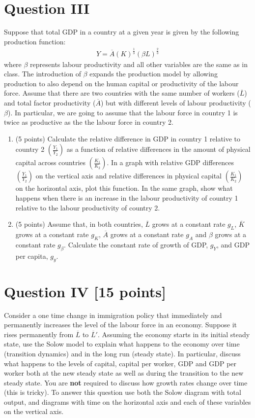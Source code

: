 \documentclass[letterpaper,12pt]{article}
\theoremstyle{dotlessS}
\begin{document}
\section*{Question III}
Suppose that total GDP in a country at a given year is given by the following production function:
\begin{eqnarray*}
Y=\overline{A}(K)^{\frac{1}{3}}(\beta L)^{\frac{2}{3}} 
\end{eqnarray*}
where $\beta$ represents labour productivity and all other variables are the same as in class. The introduction of $\beta$ expands the production model by allowing production to also depend on the human capital or productivity of the labour force.  Assume that there are two countries with the same number of workers ($\overline{L}$) and total factor productivity ($\overline{A}$) but with different levels of labour productivity ($\beta$). In particular, we are going to assume that the labour force in country 1 is twice as productive as the the labour force in country 2.
\begin{enumerate}[label=\alph*]
\item (5 points) Calculate the relative difference in GDP in country 1 relative to country 2 $\left(\frac{Y_1}{Y_2}\right)$ as a function of relative differences in the amount of physical capital  across countries $\left(\frac{K_1}{K_2}\right)$. In a graph with relative GDP differences $\left(\frac{Y_1}{Y_2}\right)$ on the vertical axis and relative differences in physical capital $\left(\frac{K_1}{K_2}\right)$ on the horizontal axis, plot this function. In the same graph, show what happens when there is an increase in the labour productivity of country 1 relative to the labour productivity of country 2.
\item (5 points) Assume that, in both countries, $\overline{L}$ grows at a constant rate $g_L$, $\overline{K}$ grows at a constant rate $g_K$, $\overline{A}$ grows at a constant rate $g_A$ and $\beta$ grows at a constant rate $g_{\beta}$. Calculate the constant rate of growth of GDP, $g_Y$, and GDP per capita, $g_y$.     
\end{enumerate}

\section*{Question IV [15 points]}
Consider a one time change in immigration policy that immediately and permanently increases the level of the labour force in an economy. Suppose it rises permanently from $\overline{L}$ to $\overline{L}'$. Assuming the economy starts in its initial steady state, use the Solow model to explain what happens to the economy over time (transition dynamics) and in the long run (steady state). In particular, discuss what happens to the levels of capital, capital per worker, GDP and GDP per worker both at the new steady state as well as during the transition to the new steady state. You are \textbf{not} required to discuss how growth rates change over time (this is tricky). To answer this question use both the Solow diagram with total output, and diagrams with time on the horizontal axis and each of these variables on the vertical axis.  
\end{document}
